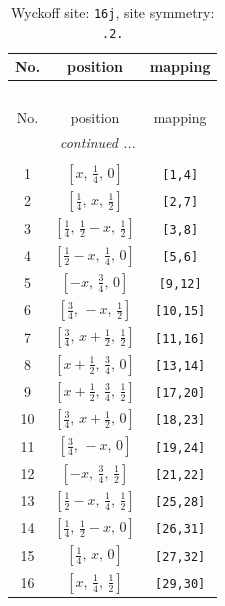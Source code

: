 \documentclass[fleqn,8pt]{jsarticle}
\begin{document}
\renewcommand{\arraystretch}{1.2}
\begin{longtable}{ccc}
\caption{Wyckoff site: {\tt 16j}, site symmetry: {\tt .2.}}
 \\
 \hline \hline
No. & position & mapping \\ \hline \endfirsthead

\multicolumn{2}{l}{\tablename\ \thetable{}} \\
 \hline \hline
No. & position & mapping \\ \hline \endhead

 \hline \hline
\multicolumn{2}{r}{\footnotesize\it continued ...} \\ \endfoot

 \hline \hline
\multicolumn{2}{r}{} \\ \endlastfoot

1 & $\left[ x,\, \frac{1}{4},\, 0 \right]$ & {\tt [1,4]} \\ \hline
2 & $\left[ \frac{1}{4},\, x,\, \frac{1}{2} \right]$ & {\tt [2,7]} \\ \hline
3 & $\left[ \frac{1}{4},\, \frac{1}{2} - x,\, \frac{1}{2} \right]$ & {\tt [3,8]} \\ \hline
4 & $\left[ \frac{1}{2} - x,\, \frac{1}{4},\, 0 \right]$ & {\tt [5,6]} \\ \hline
5 & $\left[ - x,\, \frac{3}{4},\, 0 \right]$ & {\tt [9,12]} \\ \hline
6 & $\left[ \frac{3}{4},\, - x,\, \frac{1}{2} \right]$ & {\tt [10,15]} \\ \hline
7 & $\left[ \frac{3}{4},\, x + \frac{1}{2},\, \frac{1}{2} \right]$ & {\tt [11,16]} \\ \hline
8 & $\left[ x + \frac{1}{2},\, \frac{3}{4},\, 0 \right]$ & {\tt [13,14]} \\ \hline
9 & $\left[ x + \frac{1}{2},\, \frac{3}{4},\, \frac{1}{2} \right]$ & {\tt [17,20]} \\ \hline
10 & $\left[ \frac{3}{4},\, x + \frac{1}{2},\, 0 \right]$ & {\tt [18,23]} \\ \hline
11 & $\left[ \frac{3}{4},\, - x,\, 0 \right]$ & {\tt [19,24]} \\ \hline
12 & $\left[ - x,\, \frac{3}{4},\, \frac{1}{2} \right]$ & {\tt [21,22]} \\ \hline
13 & $\left[ \frac{1}{2} - x,\, \frac{1}{4},\, \frac{1}{2} \right]$ & {\tt [25,28]} \\ \hline
14 & $\left[ \frac{1}{4},\, \frac{1}{2} - x,\, 0 \right]$ & {\tt [26,31]} \\ \hline
15 & $\left[ \frac{1}{4},\, x,\, 0 \right]$ & {\tt [27,32]} \\ \hline
16 & $\left[ x,\, \frac{1}{4},\, \frac{1}{2} \right]$ & {\tt [29,30]} \\
\end{longtable}
\end{document}
